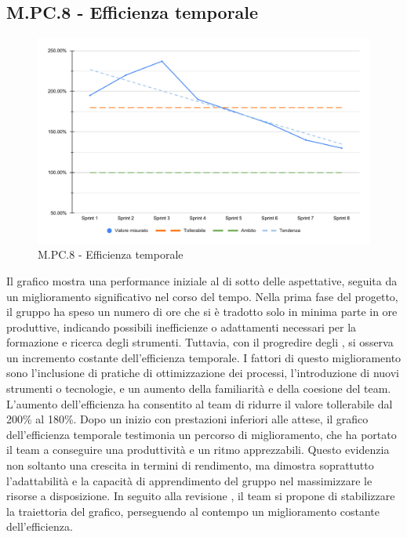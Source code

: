 \subsection{M.PC.8 - Efficienza temporale}
\begin{figure}[H]
    \centering
    \includegraphics[width=\textwidth]{assets/efficienza_temporale.pdf}
    \caption{M.PC.8 - Efficienza temporale}
\end{figure}

\par Il grafico mostra una performance iniziale al di sotto delle aspettative, seguita da un miglioramento significativo nel corso del tempo. Nella prima fase del progetto, il gruppo ha speso un numero di ore che si è tradotto solo in minima parte in ore produttive, indicando possibili inefficienze o adattamenti necessari per la formazione e ricerca degli strumenti. Tuttavia, con il progredire degli , si osserva un incremento costante dell'efficienza temporale. I fattori di questo miglioramento sono l'inclusione di pratiche di ottimizzazione dei processi, l'introduzione di nuovi strumenti o tecnologie, e un aumento della familiarità e della coesione del team. L’aumento dell’efficienza ha consentito al team di ridurre il valore tollerabile dal 200\% al 180\%.
Dopo un inizio con prestazioni inferiori alle attese, il grafico dell'efficienza temporale testimonia un percorso di miglioramento, che ha portato il team a conseguire una produttività e un ritmo apprezzabili. Questo evidenzia non soltanto una crescita in termini di rendimento, ma dimostra soprattutto l'adattabilità e la capacità di apprendimento del gruppo nel massimizzare le risorse a disposizione. In seguito alla revisione , il team si propone di stabilizzare la traiettoria del grafico, perseguendo al contempo un miglioramento costante dell’efficienza.
